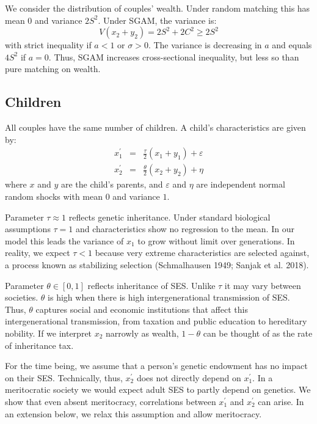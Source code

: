 \documentclass[
  12pt,
]{article}
\theoremstyle{definition}
\theoremstyle{definition}
\theoremstyle{definition}
\theoremstyle{definition}
\theoremstyle{remark}
\begin{document}
We consider the distribution of couples' wealth. Under random matching this has
mean \(0\) and variance \(2S^2\). Under SGAM, the variance is:
\[
V(x_{2}+y_{2}) = 2S^{2} + 2C^{2} \ge 2S^{2} 
\]
with strict inequality if \(a < 1\) or \(\sigma > 0\). The variance is decreasing in
\(a\) and equals \(4S^2\) if \(a = 0\). Thus, SGAM increases cross-sectional inequality,
but less so than pure matching on wealth.

\hypertarget{children}{%
\subsection{Children}\label{children}}

All couples have the same number of children. A child's characteristics are
given by:
\begin{eqnarray}
x_{1}^{\prime } &=&\frac{\tau }{2}\left( x_{1}+y_{1}\right) +\varepsilon
\label{Chil} \\
x_{2}^{\prime } &=&\frac{\theta }{2}\left( x_{2}+y_{2}\right) +\eta 
\nonumber
\end{eqnarray}
where \(x\) and \(y\) are the child's parents, and \(\varepsilon\) and \(\eta\) are
independent normal random shocks with mean \(0\) and variance \(1\).

Parameter \(\tau \approx 1\) reflects genetic inheritance. Under standard biological
assumptions \(\tau = 1\) and characteristics show no regression to the mean. In our
model this leads the variance of \(x_1\) to grow without limit over generations.
In reality, we expect \(\tau < 1\) because very extreme characteristics are
selected against, a process known as stabilizing selection
(Schmalhausen 1949; Sanjak et al. 2018).

Parameter \(\theta \in [0, 1]\) reflects inheritance of SES. Unlike \(\tau\) it may vary
between societies. \(\theta\) is high when there is high intergenerational
transmission of SES. Thus, \(\theta\) captures social and economic institutions
that affect this intergenerational transmission, from taxation and
public education to hereditary nobility. If we interpret \(x_2\) narrowly as
wealth, \(1 - \theta\) can be thought of as the rate of inheritance tax.

For the time being, we assume that a person's genetic endowment has no impact on
their SES. Technically, thus, \(x_{2}^\prime\) does not directly depend on
\(x_{1}^\prime\). In a meritocratic society we would expect adult SES to partly depend
on genetics. We show that even absent meritocracy, correlations between \(x_1^\prime\) and
\(x_{2}^\prime\) can arise. In an extension below, we relax this assumption and allow
meritocracy.
\end{document}
